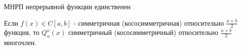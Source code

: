 \begin{ticket}
  \begin{example}
    
  \end{example}
  \begin{theorem}
    МНРП непрерывной функции единственен
  \end{theorem}
  \begin{corollary}
    Если $f(x)\in C[a,b]$ - симметричная (кососимметричная) относительно $\frac{a+b}{2}$ функция, то
    $Q_n^o(x)$ симметричный (кососимметричный) относительно $\frac{a+b}{2}$ многочлен.
  \end{corollary}  
\end{ticket}
